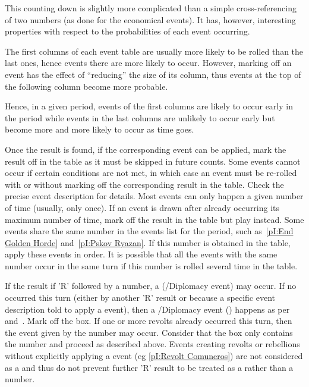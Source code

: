 \begin{designnote}
  This counting down is slightly more complicated than a simple
  cross-referencing of two numbers (as done for the economical
  events). It has, however, interesting properties with respect to the
  probabilities of each event occurring.

  The first columns of each event table are usually more likely to be
  rolled than the last ones, hence events there are more likely to
  occur. However, marking off an event has the effect of ``reducing''
  the size of its column, thus events at the top of the following column
  become more probable.

  Hence, in a given period, events of the first columns are likely to
  occur early in the period while events in the last columns are
  unlikely to occur early but become more and more likely to occur as
  time goes.
\end{designnote}

\aparag Once the result is found, if the corresponding event can be
applied, mark the result off in the table as it must be skipped in
future counts.
\bparag Some events cannot occur if certain conditions are not met, in
which case an event must be re-rolled with or without marking off the
corresponding result in the table. Check the precise event description
for details.
\bparag Most events can only happen a given number of time (usually,
only once). If an event is drawn after already occurring its maximum
number of time, mark off the result in the table but play \RD instead.
\bparag Some events share the same number in the events list for the
period, such as~\ref{pI:End Golden Horde} and~\ref{pI:Pskov Ryazan}. If
this number is obtained in the table, apply these events in order. It is
possible that all the events with the same number occur in the same turn
if this number is rolled several time in the table.

\aparag[Revolts] If the result if 'R' followed by a number, a \RD
(\REVOLT/Diplomacy event) may occur.
\bparag If no \RD occurred this turn (either by another 'R' result or
because a specific event description told to apply a \RD event), then a
\REVOLT/Diplomacy event (\RD) happens as per~
and~. Mark off the box.
\bparag If one or more revolts already occurred this turn, then the
event given by the number may occur. Consider that the box only
contains the number and proceed as described above.
\bparag Events creating revolts or rebellions without explicitly
applying a \RD event (eg \ref{pI:Revolt Comuneros}) are not considered
as a \RD and thus do not prevent further 'R' result to be treated as a
\RD rather than a number.

